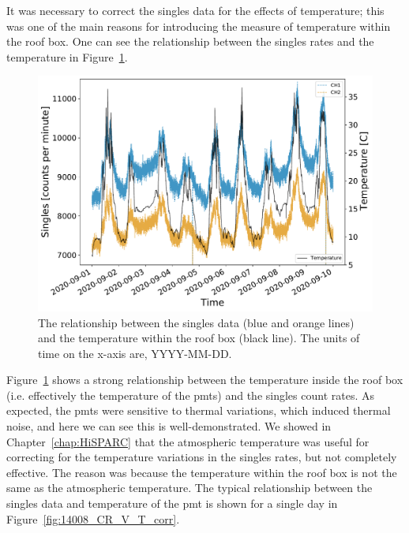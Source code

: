 It was necessary to correct the singles data for the effects of temperature; this was one of the main reasons for introducing the measure of temperature within the roof box. One can see the relationship between the singles rates and the temperature in Figure~\ref{fig:HS_14008_temperature_vs_CR}.

\begin{figure}[ht!]
	\centering
	\includegraphics[width=0.7\columnwidth]{HS_14008_CR_v_T_sept2020.pdf}
	\caption{The relationship between the singles data (blue and orange lines) and the temperature within the roof box (black line). The units of time on the x-axis are, YYYY-MM-DD.}
	\label{fig:HS_14008_temperature_vs_CR}
\end{figure}


Figure~\ref{fig:HS_14008_temperature_vs_CR} shows a strong relationship between the temperature inside the roof box (i.e. effectively the temperature of the \glspl{pmt}) and the singles count rates. As expected, the \glspl{pmt} were sensitive to thermal variations, which induced thermal noise, and here we can see this is well-demonstrated. We showed in Chapter~\ref{chap:HiSPARC} that the atmospheric temperature was useful for correcting for the temperature variations in the singles rates, but not completely effective. The reason was because the temperature within the roof box is not the same as the atmospheric temperature. The typical relationship between the singles data and temperature of the \gls{pmt} is shown for a single day in Figure~\ref{fig:14008_CR_V_T_corr}.

